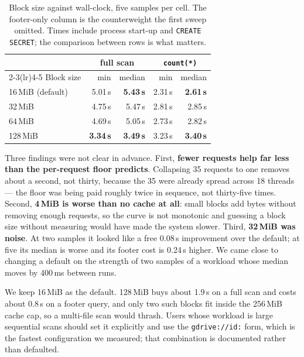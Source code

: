 \documentclass[sigconf, nonacm]{acmart}
\begin{document}
\begin{table}[t]
\caption{Block size against wall-clock, five samples per cell. The footer-only
column is the counterweight the first sweep omitted. Times include process
start-up and \texttt{CREATE SECRET}; the comparison between rows is what
matters.}
\label{tab:blocksweep}
\small
\begin{tabular}{lrrrr}
\toprule
& \multicolumn{2}{c}{full scan} & \multicolumn{2}{c}{\texttt{count(*)}} \\
\cmidrule(lr){2-3}\cmidrule(lr){4-5}
Block size & min & median & min & median \\
\midrule
16\,MiB (default) & 5.01\,s & \textbf{5.43\,s} & 2.31\,s & \textbf{2.61\,s} \\
32\,MiB           & 4.75\,s & 5.47\,s & 2.81\,s & 2.85\,s \\
64\,MiB           & 4.69\,s & 5.05\,s & 2.73\,s & 2.82\,s \\
128\,MiB          & \textbf{3.34\,s} & \textbf{3.49\,s} & 3.23\,s & \textbf{3.40\,s} \\
\bottomrule
\end{tabular}
\end{table}

Three findings were not clear in advance. First, \textbf{fewer requests help
far less than the per-request floor predicts}. Collapsing 35 requests to
one removes about a second, not thirty, because the 35 were already spread
across 18 threads --- the floor was being paid roughly twice in sequence, not
thirty-five times. Second, \textbf{4\,MiB is worse than no cache at all}: small
blocks add bytes without removing enough requests, so the curve is not
monotonic and guessing a block size without measuring would have made the
system slower. Third, \textbf{32\,MiB was noise}. At two samples it looked like
a free 0.08\,s improvement over the default; at five its median is worse and
its footer cost is 0.24\,s higher. We came close to changing a default on the
strength of two samples of a workload whose median moves by 400\,ms between
runs.

We keep 16\,MiB as the default. 128\,MiB buys about 1.9\,s on a full scan and
costs about 0.8\,s on a footer query, and only two such blocks fit inside the
256\,MiB cache cap, so a multi-file scan would thrash. Users whose workload is
large sequential scans should set it explicitly and use the
\texttt{gdrive://id:} form, which is the fastest configuration we measured;
that combination is documented rather than defaulted.
\end{document}
